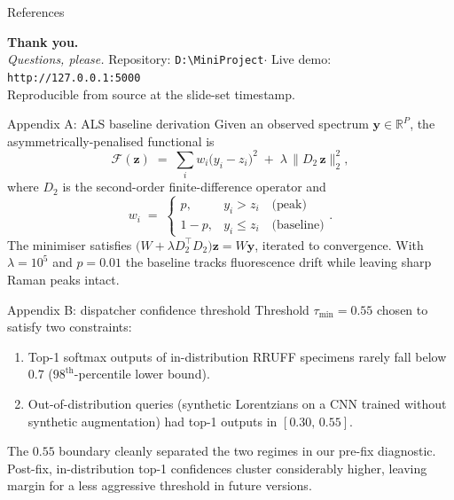\documentclass[10pt,aspectratio=169,xcolor=dvipsnames]{beamer}
\newcommand{\code}[1]{\texttt{\small #1}}
\begin{document}
\begin{frame}[allowframebreaks]{References}
  \nocite{*}
  \printbibliography[heading=none]
\end{frame}

\begin{frame}[standout]
  \textbf{Thank you.}\\[1em]
  \textit{Questions, please.}
  \vfill
  \scriptsize
  Repository: \code{D:\textbackslash{}MiniProject}\quad$\cdot$\quad
  Live demo: \code{http://127.0.0.1:5000}\\
  Reproducible from source at the slide-set timestamp.
\end{frame}

\appendix

\begin{frame}{Appendix A: ALS baseline derivation}
  Given an observed spectrum $\mathbf{y} \in \mathbb{R}^{P}$, the
  asymmetrically-penalised functional is
  \[
    \mathcal{F}(\mathbf{z}) \;=\;
      \sum_{i} w_i \bigl(y_i - z_i\bigr)^{2}
      \;+\; \lambda\, \bigl\| D_{2}\,\mathbf{z} \bigr\|_{2}^{2},
  \]
  where $D_{2}$ is the second-order finite-difference operator and
  \[
    w_i \;=\;
      \begin{cases}
        p,            & y_i > z_i \quad \text{(peak)}\\
        1 - p,        & y_i \leq z_i \quad \text{(baseline)}
      \end{cases}.
  \]
  The minimiser satisfies
  $\bigl(W + \lambda D_{2}^{\!\top} D_{2}\bigr)\mathbf{z} = W\mathbf{y}$,
  iterated to convergence. With $\lambda = 10^5$ and $p = 0.01$ the
  baseline tracks fluorescence drift while leaving sharp Raman peaks intact.
\end{frame}

\begin{frame}{Appendix B: dispatcher confidence threshold}
  Threshold $\tau_{\min} = 0.55$ chosen to satisfy two constraints:
  \begin{enumerate}
    \item Top-1 softmax outputs of in-distribution RRUFF specimens
          rarely fall below $0.7$ ($98^{\text{th}}$-percentile lower bound).
    \item Out-of-distribution queries (synthetic Lorentzians on a CNN
          trained without synthetic augmentation) had top-1 outputs in
          $[0.30,\,0.55]$.
  \end{enumerate}
  \medskip
  The $0.55$ boundary cleanly separated the two regimes in our pre-fix
  diagnostic. Post-fix, in-distribution top-1 confidences cluster
  considerably higher, leaving margin for a less aggressive threshold
  in future versions.
\end{frame}
\end{document}
